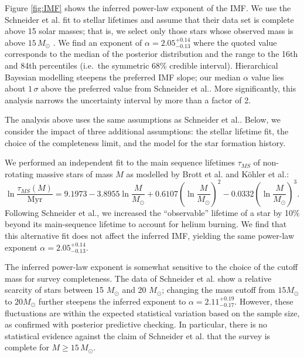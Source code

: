 \documentclass[12pt]{article}
\newcommand{\MSun}{M_\odot}
\newcommand{\onesigrange}[3]{\ensuremath{#1^{+#2}_{-#3}}}
\newcommand{\alpharangeone}{\onesigrange{2.05}{0.14}{0.13}}
\newcommand{\alpharangetwo}{\onesigrange{2.05}{0.14}{0.13}}
\newcommand{\alpharangethree}{\onesigrange{2.11}{0.19}{0.17}}
\begin{document}
Figure \ref{fig:IMF} shows the inferred power-law exponent of the IMF.   We use the Schneider et al.\cite{Schneider:2018} fit to stellar lifetimes and assume
that their data set is complete above 15 solar masses; that is, we select only
those stars whose observed mass is above $15 \, M_\odot$
\cite{Loredo:2004,BBH:O1}.  We find
an exponent of $\alpha=\alpharangeone$ where the quoted value corresponds to the median
of the posterior distribution and the range to the 16th and 84th percentiles
(i.e.\ the symmetric 68\% credible interval).  Hierarchical Bayesian modelling steepens the preferred IMF
slope; our median $\alpha$ value lies about $1\, \sigma$ above the preferred value from
Schneider et al.\cite{Schneider:2018}.  More significantly, this analysis narrows the uncertainty interval by more than a factor of 2.

The analysis above uses the same assumptions as Schneider et al.\cite{Schneider:2018}.  Below, we consider the impact of three additional  assumptions: the stellar lifetime fit, the choice of the completeness limit, and the model for the star formation history.

We performed an independent fit to the main sequence lifetimes
$\tau_{MS}$ of non-rotating massive stars of mass $M$ as modelled by Brott et al.\cite{Brott:2011} and K\"{o}hler et al.\cite{Kohler:2015}:
%
\begin{equation}
\ln \frac{\tau_{MS} (M)}{\textrm{Myr}} = 9.1973 - 3.8955 \ln\frac{M}{M_\odot} 
+ 0.6107 \left(\ln\frac{M}{M_\odot} \right)^2 - 0.0332 \left(\ln\frac{M}{M_\odot}\right)^3.
\end{equation}
%
Following Schneider et al.\cite{Schneider:2018}, we increased the ``observable''
lifetime of a star by 10\% beyond its main-sequence lifetime to account for
helium burning.  We find that this alternative fit does not affect the inferred IMF, yielding the same power-law exponent $\alpha=\alpharangetwo$.

The inferred power-law exponent is somewhat sensitive to
the choice of the cutoff mass for survey completeness.  The data of Schneider et al.\cite{Schneider:2018} show a relative scarcity of stars between 15 $M_\odot$ and 20 $M_\odot$; changing the mass cutoff from $15 M_\odot$ to $20 M_\odot$ further steepens the inferred exponent to $\alpha=\alpharangethree$.    However, these fluctuations are within the expected statistical variation based on the sample size, as confirmed with posterior predictive
checking.  In particular, there is no statistical evidence against the claim of Schneider et al.\cite{Schneider:2018} that
the survey is complete for $M \geq 15 \, \MSun$.
\end{document}
